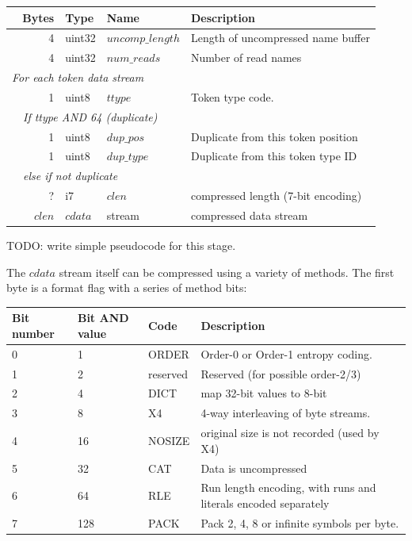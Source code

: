 \documentclass[a4paper]{article}
\begin{document}
\begin{tabular}{|r|r|r|l|l|p{10cm}|}
\hline
\multicolumn{3}{|r|}{\textbf{Bytes}} & \textbf{Type} & \textbf{Name} & \textbf{Description}\\
\hline
\multicolumn{3}{|r|}{4} & uint32 & $uncomp\_length$ & Length of uncompressed name buffer\\
\multicolumn{3}{|r|}{4} & uint32 & $num\_reads$ & Number of read names\\
\hline
\multicolumn{6}{|l|}{\quad\textit{For each token data stream}}\\
\cline{2-6}
& \multicolumn{2}{r|}{1} & uint8 & $ttype$ & Token type code.\\
\cline{2-6}
& \multicolumn{5}{l|}{\textit{If ttype AND 64 (duplicate)}}\\
\cline{3-6}
& & 1 & uint8 & $dup\_pos$  & Duplicate from this token position\\
& & 1 & uint8 & $dup\_type$ & Duplicate from this token type ID\\
\cline{3-6}
& \multicolumn{5}{l|}{\textit{else if not duplicate}}\\
\cline{3-6}
& & ? & i7 & $clen$ & compressed length (7-bit encoding)\\
& & $clen$ & $cdata$ & stream & compressed data stream\\
\hline
\end{tabular}

TODO: write simple pseudocode for this stage.

The $cdata$ stream itself can be compressed using a variety of
methods.  The first byte is a format flag with a series of method bits:

\begin{tabular}{llll}
\hline
\textbf{Bit number} & \textbf{Bit AND value} & \textbf{Code} & \textbf{Description} \\
\hline
0 & 1 & ORDER & Order-0 or Order-1 entropy coding. \\
1 & 2 & reserved & Reserved (for possible order-2/3)\\
2 & 4 & DICT & map 32-bit values to 8-bit\\
3 & 8 & X4 & 4-way interleaving of byte streams.\\
4 & 16 & NOSIZE & original size is not recorded (used by X4)\\
5 & 32 & CAT & Data is uncompressed\\
6 & 64 & RLE & Run length encoding, with runs and literals encoded separately\\
7 & 128 & PACK & Pack 2, 4, 8 or infinite symbols per byte.\\
\hline
\end{tabular}
\end{document}
